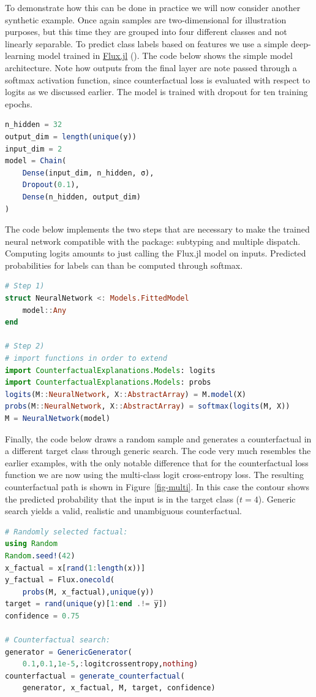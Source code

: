 \documentclass[
  letterpaper,
  DIV=11,
  numbers=noendperiod]{scrartcl}
\begin{document}
To demonstrate how this can be done in practice we will now consider
another synthetic example. Once again samples are two-dimensional for
illustration purposes, but this time they are grouped into four
different classes and not linearly separable. To predict class labels
based on features we use a simple deep-learning model trained in
\href{https://fluxml.ai/}{Flux.jl} (\cite{innes2018flux}). The code
below shows the simple model architecture. Note how outputs from the
final layer are note passed through a softmax activation function, since
counterfactual loss is evaluated with respect to logits as we discussed
earlier. The model is trained with dropout for ten training epochs.

\begin{lstlisting}[language = Julia]
n_hidden = 32
output_dim = length(unique(y))
input_dim = 2
model = Chain(
    Dense(input_dim, n_hidden, σ),
    Dropout(0.1),
    Dense(n_hidden, output_dim)
)  
\end{lstlisting}

The code below implements the two steps that are necessary to make the
trained neural network compatible with the package: subtyping and
multiple dispatch. Computing logits amounts to just calling the Flux.jl
model on inputs. Predicted probabilities for labels can than be computed
through softmax.

\begin{lstlisting}[language = Julia]
# Step 1)
struct NeuralNetwork <: Models.FittedModel
    model::Any
end

# Step 2)
# import functions in order to extend
import CounterfactualExplanations.Models: logits
import CounterfactualExplanations.Models: probs 
logits(M::NeuralNetwork, X::AbstractArray) = M.model(X)
probs(M::NeuralNetwork, X::AbstractArray) = softmax(logits(M, X))
M = NeuralNetwork(model)
\end{lstlisting}

Finally, the code below draws a random sample and generates a
counterfactual in a different target class through generic search. The
code very much resembles the earlier examples, with the only notable
difference that for the counterfactual loss function we are now using
the multi-class logit cross-entropy loss. The resulting counterfactual
path is shown in Figure~\ref{fig-multi}. In this case the contour shows
the predicted probability that the input is in the target class
(\(t=4\)). Generic search yields a valid, realistic and unambiguous
counterfactual.

\begin{lstlisting}[language = Julia]
# Randomly selected factual:
using Random
Random.seed!(42)
x_factual = x[rand(1:length(x))]
y_factual = Flux.onecold(
    probs(M, x_factual),unique(y))
target = rand(unique(y)[1:end .!= y̅]) 
confidence = 0.75

# Counterfactual search:
generator = GenericGenerator(
    0.1,0.1,1e-5,:logitcrossentropy,nothing)
counterfactual = generate_counterfactual(
    generator, x_factual, M, target, confidence)
\end{lstlisting}
\end{document}
